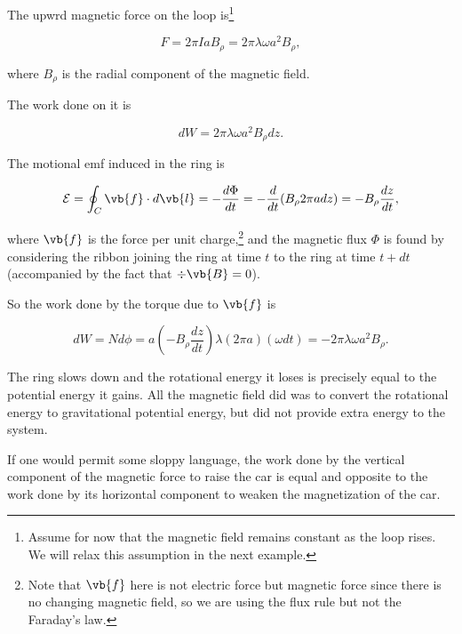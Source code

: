 \documentclass[english,a4paper,12pt]{report}
\begin{document}
{The upwrd magnetic force on the loop is\footnote{Assume for now that the magnetic field remains constant as the loop rises. We will relax this assumption in the next example.} 

\begin{equation}
    F = 2\pi I a B_{\rho } = 2\pi \lambda \omega a^2B_{\rho } , 
\end{equation}

where \(B_{\rho } \) is the radial component of the magnetic field. 

The work done on it is 

\begin{equation}
    dW = 2\pi \lambda \omega a^2B_{\rho }dz. 
\end{equation}

The motional emf induced in the ring is

\begin{equation}
    \mathcal{E} = \oint_{C} \vb{f} \cdot d\vb{l} = - \frac{d\Phi }{dt} = -\frac{d}{dt} (B_{\rho } 2\pi a dz ) = -B_{\rho } \frac{dz}{dt},   
\end{equation}

where \(\vb{f} \) is the force per unit charge,\footnote{Note that \(\vb{f} \) here is not electric force but magnetic force since there is no changing magnetic field, so we are using the flux rule but not the Faraday's law.} and the magnetic flux \(\Phi \) is found by considering the ribbon joining the ring at time \(t\) to the ring at time \(t+dt\) (accompanied by the fact that \(\div{\vb{B} } = 0 \)).    

So the work done by the torque due to \(\vb{f} \) is 

\begin{equation}
    dW = Nd\phi = a\left( -B_{\rho } \frac{dz}{dt}   \right) \lambda (2\pi a)(\omega dt) = -2\pi \lambda \omega a^2B_{\rho }. 
\end{equation}

The ring slows down and the rotational energy it loses is precisely equal to the potential energy it gains. All the magnetic field did was to convert the rotational energy to gravitational potential energy, but did not provide extra energy to the system.

If one would permit some sloppy language, the work done by the vertical component of the magnetic force to raise the car is equal and opposite to the work done by its horizontal component to weaken the magnetization of the car.


} 
\end{document}
